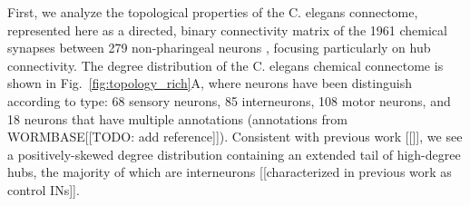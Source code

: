 \documentclass[10pt,letterpaper]{article}
\begin{document}

First, we analyze the topological properties of the C. elegans connectome, represented here as a directed, binary connectivity matrix of the 1961 chemical synapses between 279 non-pharingeal neurons \cite{Varshney2011}, focusing particularly on hub connectivity.
The degree distribution of the C. elegans chemical connectome is shown in Fig.~\ref{fig:topology_rich}A, where neurons have been distinguish according to type: 68 sensory neurons, 85 interneurons, 108 motor neurons, and 18 neurons that have multiple annotations (annotations from WORMBASE[[TODO: add reference]]).
Consistent with previous work [[]], we see a positively-skewed degree distribution containing an extended tail of high-degree hubs, the majority of which are interneurons [[characterized in previous work as control INs]].
\end{document}
